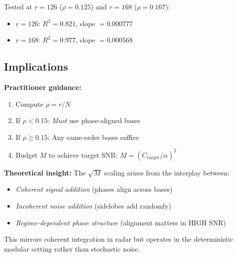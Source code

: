 Tested at $r=126$ ($\rho=0.125$) and $r=168$ ($\rho=0.167$):
\begin{itemize}
    \item $r=126$: $R^2 = 0.821$, slope $= 0.000777$
    \item $r=168$: $R^2 = 0.977$, slope $= 0.000568$
\end{itemize}

\subsection{Implications}

\textbf{Practitioner guidance:}
\begin{enumerate}
    \item Compute $\rho = r/N$
    \item If $\rho < 0.15$: \emph{Must} use phase-aligned bases
    \item If $\rho \geq 0.15$: Any same-order bases suffice
    \item Budget $M$ to achieve target SNR: $M = (C_{\text{target}}/\alpha)^2$
\end{enumerate}

\textbf{Theoretical insight:} The $\sqrt{M}$ scaling arises from the interplay between:
\begin{itemize}
    \item \emph{Coherent signal addition} (phases align across bases)
    \item \emph{Incoherent noise addition} (sidelobes add randomly)
    \item \emph{Regime-dependent phase structure} (alignment matters in HIGH SNR)
\end{itemize}

This mirrors coherent integration in radar but operates in the deterministic modular setting rather than stochastic noise.
